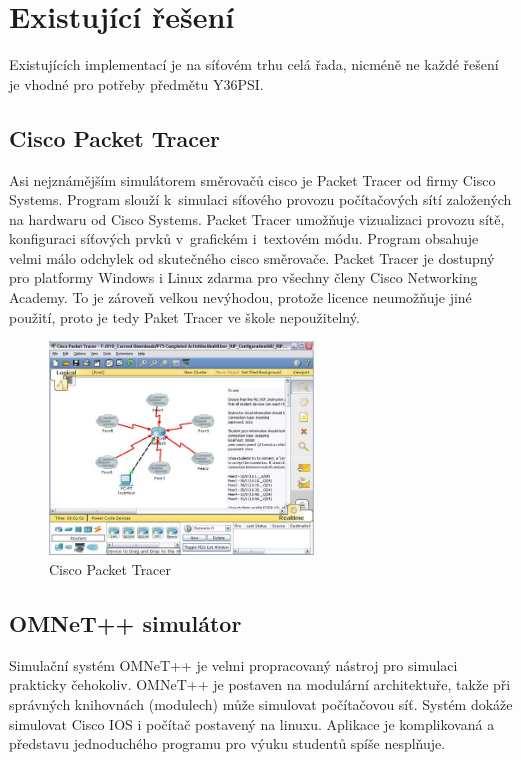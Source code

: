 \chapter{Existující řešení}
Existujících implementací je na síťovém trhu celá řada, nicméně ne každé řešení je vhodné pro potřeby předmětu Y36PSI.

\section{Cisco Packet Tracer}
Asi nejznámějším simulátorem směrovačů cisco je Packet Tracer \cite{cisco:pt} od firmy Cisco Systems. Program slouží k~simulaci síťového provozu počítačových sítí založených na hardwaru od Cisco Systems. Packet Tracer umožňuje vizualizaci provozu sítě, konfiguraci síťových prvků v~grafickém i~textovém módu. Program obsahuje velmi málo odchylek od skutečného cisco směrovače. Packet Tracer je dostupný pro platformy Windows i Linux zdarma pro všechny členy Cisco Networking Academy. To je zároveň velkou nevýhodou, protože licence neumožňuje jiné použití, proto je tedy Paket Tracer ve škole nepoužitelný.

\begin{figure}[h]
\begin{center}
\includegraphics[width=7cm]{figures/r_cpt}
\caption{Cisco Packet Tracer}
\label{fig:r_cpt}
\end{center}
\end{figure}

\section{OMNeT++ simulátor} 
Simulační systém OMNeT++ \cite{reserse:omnet_hp} je velmi propracovaný nástroj pro simulaci prakticky čehokoliv. OMNeT++ je postaven na modulární architektuře, takže při správných knihovnách (modulech) může simulovat počítačovou síť. Systém dokáže simulovat Cisco IOS i počítač postavený na linuxu. Aplikace je komplikovaná a představu jednoduchého programu pro výuku studentů spíše nesplňuje.

